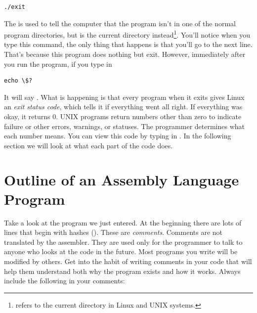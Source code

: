 \begin{simpletyping}
\begin{lstlisting}
./exit
\end{lstlisting}
\end{simpletyping}

The  is used to tell the computer that the program
isn't in one of the normal program directories, but is the current
directory instead\footnote{ refers 
to the current directory in Linux and UNIX systems.}.  
You'll notice
when you type this command, the only thing that happens is that you'll go
to the next line.  That's because this program does nothing but exit.
However, immediately after you run the program, if you type in


\begin{simpletyping}
\begin{lstlisting}
echo \$?
\end{lstlisting}
\end{simpletyping}

It will say .  What is happening is that every program
when it exits gives Linux an \emph{exit status code},
which tells it if everything went all right.  If everything was okay, it
returns 0.  UNIX programs return numbers other than zero to indicate 
failure or other errors, warnings, or statuses.  The programmer determines what each number means.  You can view this code by typing in 
.
In the following section we will look at what each part of the code
does.

\section{Outline of an Assembly Language Program}
\label{assemblyoutline}

Take a look at the program we just entered.  At the beginning there are
lots of lines that begin with
hashes (\icode{\#}).  These are \emph{comments}.
Comments are not translated by the assembler.  They are used only for
the programmer to talk to anyone who looks at the
code in the future.  Most programs you write will be modified by others.  Get 
into the habit of writing comments in your code that will
help them understand both why the program exists and how it works.  
Always include the following in your comments:

